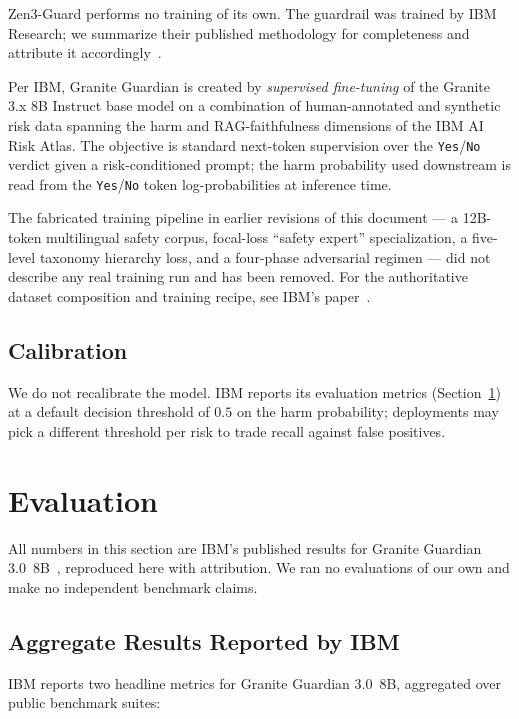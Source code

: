 \documentclass[11pt,a4paper]{article}
\begin{document}
Zen3-Guard performs no training of its own. The guardrail was trained by IBM Research;
we summarize their published methodology for completeness and attribute it
accordingly~\cite{graniteguardian}.

Per IBM, Granite Guardian is created by \emph{supervised fine-tuning} of the Granite 3.x
8B Instruct base model on a combination of human-annotated and synthetic risk data
spanning the harm and RAG-faithfulness dimensions of the IBM AI Risk Atlas. The objective
is standard next-token supervision over the \texttt{Yes}/\texttt{No} verdict given a
risk-conditioned prompt; the harm probability used downstream is read from the
\texttt{Yes}/\texttt{No} token log-probabilities at inference time.

The fabricated training pipeline in earlier revisions of this document --- a 12B-token
multilingual safety corpus, focal-loss ``safety expert'' specialization, a five-level
taxonomy hierarchy loss, and a four-phase adversarial regimen --- did not describe any real
training run and has been removed. For the authoritative dataset composition and training
recipe, see IBM's paper~\cite{graniteguardian}.

\subsection{Calibration}

We do not recalibrate the model. IBM reports its evaluation metrics (Section~\ref{sec:eval})
at a default decision threshold of $0.5$ on the harm probability; deployments may pick a
different threshold per risk to trade recall against false positives.

\section{Evaluation}
\label{sec:eval}

All numbers in this section are IBM's published results for Granite Guardian
3.0~8B~\cite{graniteguardian}, reproduced here with attribution. We ran no evaluations of
our own and make no independent benchmark claims.

\subsection{Aggregate Results Reported by IBM}

IBM reports two headline metrics for Granite Guardian 3.0~8B, aggregated over public
benchmark suites:
\end{document}
